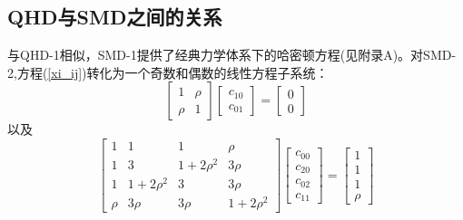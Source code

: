 \subsection{QHD与SMD之间的关系}
与QHD-1相似，SMD-1提供了经典力学体系下的哈密顿方程(见附录A)。对SMD-2,方程(\ref{xi_ij})转化为一个奇数和偶数的线性方程子系统：
\begin{equation}
	\left[\begin{array}{ll}
{1} & {\rho} \\
{\rho} & {1}
\end{array}\right]\left[\begin{array}{l}
{c_{10}} \\
{c_{01}}
\end{array}\right]=\left[\begin{array}{l}
{0} \\
{0}
\end{array}\right]
\end{equation}
以及
\begin{equation}
	\left[\begin{array}{cccc}
{1} & {1} & {1} & {\rho} \\
{1} & {3} & {1+2 \rho^{2}} & {3 \rho} \\
{1} & {1+2 \rho^{2}} & {3} & {3 \rho} \\
{\rho} & {3 \rho} & {3 \rho} & {1+2 \rho^{2}}
\end{array}\right]\left[\begin{array}{l}
{c_{00}} \\
{c_{20}} \\
{c_{02}} \\
{c_{11}}
\end{array}\right]=\left[\begin{array}{c}
{1} \\
{1} \\
{1} \\
{\rho}
\end{array}\right]
\end{equation}
